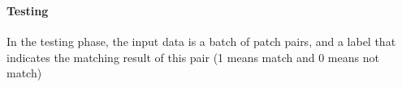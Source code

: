 \documentclass[11pt]{article}
\begin{document}
    \begin{center}
    \end{center}
    { \hspace*{\fill} \\}
    
    \begin{center}
    \end{center}
    { \hspace*{\fill} \\}
    
    \hypertarget{testing}{%
\paragraph{Testing}\label{testing}}

In the testing phase, the input data is a batch of patch pairs, and a
label that indicates the matching result of this pair (1 means match and
0 means not match)
\end{document}

